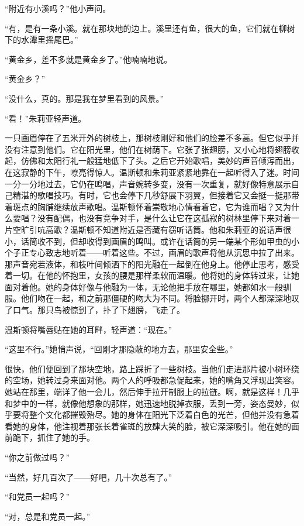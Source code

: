 ``附近有小溪吗？''他小声问。

``有，是有一条小溪。就在那块地的边上。溪里还有鱼，很大的鱼，它们就在柳树下的水潭里摇尾巴。''

``黄金乡，差不多就是黄金乡了。''他喃喃地说。

``黄金乡？''

``没什么，真的。那是我在梦里看到的风景。''

``看！''朱莉亚轻声道。

一只画眉停在了五米开外的树枝上，那树枝刚好和他们的脸差不多高。但它似乎并没有注意到他们。它在阳光里，他们在树荫下。它张了张翅膀，又小心地将翅膀收起，仿佛和太阳行礼一般猛地低下了头。之后它开始歌唱，美妙的声音倾泻而出，在这寂静的下午，嘹亮得惊人。温斯顿和朱莉亚紧紧地靠在一起听得入了迷。时间一分一分地过去，它仍在鸣唱，声音婉转多变，没有一次重复，就好像特意展示自己精湛的歌唱技巧。有时，它也会停下几秒舒展下羽翼，但接着它又会挺一挺那带着斑点的胸脯继续放声歌唱。温斯顿怀着崇敬地心情看着它，它为谁而唱？又为什么要唱？没有配偶，也没有竞争对手，是什么让它在这孤寂的树林里停下来对着一片空旷引吭高歌？温斯顿不知道附近是否藏有窃听话筒。他和朱莉亚的说话声很小，话筒收不到，但却收得到画眉的鸣叫。或许在话筒的另一端某个形如甲虫的小个子正专心致志地听着------听着这些。不过，画眉的歌声将他从沉思中拉了出来。那声音宛若液体，和枝叶间倾洒下的阳光融在一起倒在他身上。他停止思考，感受着一切。在他的怀抱里，女孩的腰是那样柔软而温暖。他将她的身体转过来，让她面对着他。她的身体好像与他融为一体，无论他把手放在哪里，她都如水一般驯服。他们吻在一起，和之前那僵硬的吻大为不同。将脸挪开时，两个人都深深地叹了口气。那只鸟被惊到了，扑了下翅膀，飞走了。

温斯顿将嘴唇贴在她的耳畔，轻声道：``现在。''

``这里不行。''她悄声说，``回刚才那隐蔽的地方去，那里安全些。''

很快，他们便回到了那块空地，路上踩折了一些树枝。当他们走进那片被小树环绕的空场，她转过身来面对他。两个人的呼吸都急促起来，她的嘴角又浮现出笑容。她站在那里，端详了他一会儿，然后伸手拉开制服上的拉链。啊，就是这样！几乎和梦中的一样，就像他想象的那样，她迅速地脱掉衣服，丢到一旁，姿态曼妙，似乎要将整个文化都摧毁殆尽。她的身体在阳光下泛着白色的光芒，但他并没有急着看她的身体，他注视着那张长着雀斑的放肆大笑的脸，被它深深吸引。他在她的面前跪下，抓住了她的手。

``你之前做过吗？''

``当然，好几百次了------好吧，几十次总有了。''

``和党员一起吗？''

``对，总是和党员一起。''

